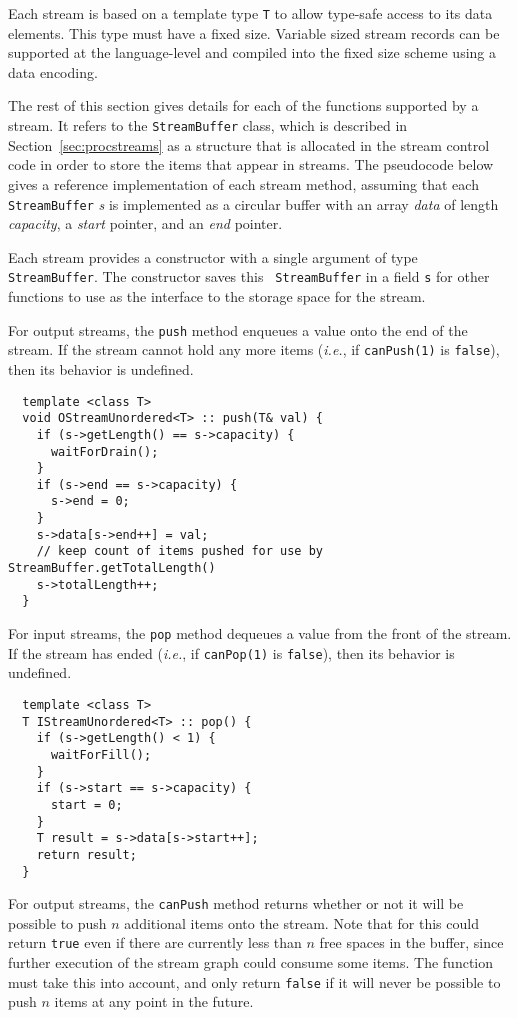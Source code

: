 Each stream is based on a template type {\tt T} to allow type-safe
access to its data elements.  This type must have a fixed size.
Variable sized stream records can be supported at the language-level
and compiled into the fixed size scheme using a data encoding.

The rest of this section gives details for each of the functions
supported by a stream.  It refers to the {\tt StreamBuffer} class,
which is described in Section~\ref{sec:procstreams} as a structure
that is allocated in the stream control code in order to store the
items that appear in streams.  The pseudocode below gives a reference
implementation of each stream method, assuming that each {\tt
StreamBuffer} {\it s} is implemented as a circular buffer with an
array {\it data} of length {\it capacity}, a {\it start} pointer, and
an {\it end} pointer.

 Each stream provides a constructor with a single
argument of type {\tt StreamBuffer}.  The constructor saves this {\tt
StreamBuffer} in a field {\tt s} for other functions to use as the
interface to the storage space for the stream.

 For output streams, the {\tt push} method enqueues a value
onto the end of the stream.  If the stream cannot hold any more items
({\it i.e.}, if {\tt canPush(1)} is {\tt false}), then its behavior is
undefined.

{\small
\begin{verbatim}
  template <class T>
  void OStreamUnordered<T> :: push(T& val) {
    if (s->getLength() == s->capacity) {
      waitForDrain();
    }
    if (s->end == s->capacity) {
      s->end = 0;
    }
    s->data[s->end++] = val;
    // keep count of items pushed for use by StreamBuffer.getTotalLength()
    s->totalLength++;
  }
\end{verbatim}}

 For input streams, the {\tt pop} method dequeues a value
from the front of the stream.  If the stream has ended ({\it i.e.}, if
{\tt canPop(1)} is {\tt false}), then its behavior is undefined.

{\small
\begin{verbatim}
  template <class T>
  T IStreamUnordered<T> :: pop() {
    if (s->getLength() < 1) {
      waitForFill();
    }
    if (s->start == s->capacity) {
      start = 0;
    }
    T result = s->data[s->start++];
    return result;
  }
\end{verbatim}}

 For output streams, the {\tt canPush} method returns
whether or not it will be possible to push $n$ additional items onto
the stream.  Note that for this could return {\tt true} even if there
are currently less than $n$ free spaces in the buffer, since further
execution of the stream graph could consume some items.  The function
must take this into account, and only return {\tt false} if it will
never be possible to push $n$ items at any point in the future.

